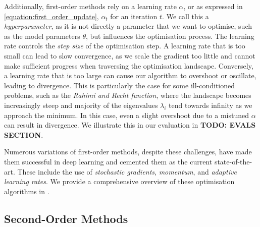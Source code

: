 Additionally, first-order methods rely on a learning rate $\alpha$, or as expressed in \cref{equation:first_order_update}, $\alpha_t$ for an iteration $t$. We call this a \textit{hyperparameter}, as it is not directly a parameter that we want to optimise, such as the model parameters $\theta$, but influences the optimisation process. The learning rate controls the \textit{step size} of the optimisation step. A learning rate that is too small can lead to slow convergence, as we scale the gradient too little and cannot make sufficient progress when traversing the optimisation landscape. Conversely, a learning rate that is too large can cause our algorithm to overshoot or oscillate, leading to divergence. This is particularly the case for some ill-conditioned problems, such as the \textit{Rahimi and Recht function}, where the landscape becomes increasingly steep and majority of the eigenvalues $\lambda_i$ tend towards infinity as we approach the minimum. In this case, even a slight overshoot due to a mistuned $\alpha$ can result in divergence. We illustrate this in our evaluation in \textbf{TODO: EVALS SECTION}. 

Numerous variations of first-order methods, despite these challenges, have made them successful in deep learning and cemented them as the current state-of-the-art. These include the use of \textit{stochastic gradients}, \textit{momentum}, and \textit{adaptive learning rates}. We provide a comprehensive overview of these optimisation algorithms in .

\subsection{Second-Order Methods}
\label{ssec:second_order_methods}

